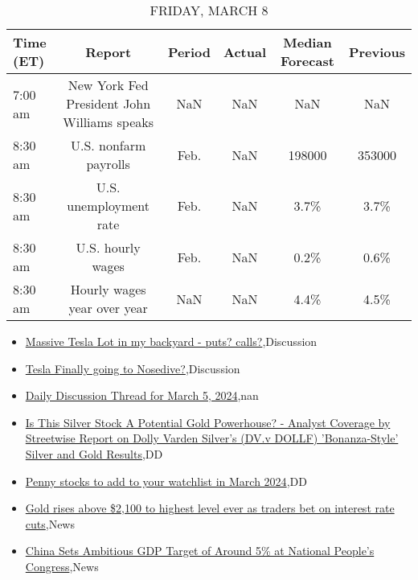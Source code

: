\documentclass{article}%
\begin{document}
%


\begin{table}[htbp]%
\caption{FRIDAY, MARCH 8}%
\centering%
\begin{adjustbox}{width=1\textwidth}%
\begin{tabular}{lccccc}
\toprule
Time (ET) &                                      Report & Period & Actual & Median Forecast & Previous \\
\midrule
  7:00 am & New York Fed President John Williams speaks &    NaN &    NaN &             NaN &      NaN \\
  8:30 am &                       U.S. nonfarm payrolls &   Feb. &    NaN &          198000 &   353000 \\
  8:30 am &                      U.S. unemployment rate &   Feb. &    NaN &            3.7\% &     3.7\% \\
  8:30 am &                           U.S. hourly wages &   Feb. &    NaN &            0.2\% &     0.6\% \\
  8:30 am &                 Hourly wages year over year &    NaN &    NaN &            4.4\% &     4.5\% \\
\bottomrule
\end{tabular}
%
\end{adjustbox}%
\end{table}

%
\begin{itemize}%
\item%
\href{https://reddit.com/r/wallstreetbets/comments/1b73k25/massive\_tesla\_lot\_in\_my\_backyard\_puts\_calls/}{Massive Tesla Lot in my backyard - puts? calls?},Discussion%
\item%
\href{https://reddit.com/r/wallstreetbets/comments/1b73cor/tesla\_finally\_going\_to\_nosedive/}{Tesla Finally going to Nosedive?},Discussion%
\item%
\href{https://reddit.com/r/wallstreetbets/comments/1b72tbp/daily\_discussion\_thread\_for\_march\_5\_2024/}{Daily Discussion Thread for March 5, 2024},nan%
\item%
\href{https://reddit.com/r/Baystreetbets/comments/1b6opzm/is\_this\_silver\_stock\_a\_potential\_gold\_powerhouse/}{Is This Silver Stock A Potential Gold Powerhouse? - Analyst Coverage by Streetwise Report on Dolly Varden Silver's (DV.v DOLLF) 'Bonanza-Style' Silver and Gold Results},DD%
\item%
\href{https://reddit.com/r/Baystreetbets/comments/1b6i1xe/penny\_stocks\_to\_add\_to\_your\_watchlist\_in\_march/}{Penny stocks to add to your watchlist in March 2024},DD%
\item%
\href{https://reddit.com/r/StockMarket/comments/1b6pqp2/gold\_rises\_above\_2100\_to\_highest\_level\_ever\_as/}{Gold rises above \$2,100 to highest level ever as traders bet on interest rate cuts},News%
\item%
\href{https://reddit.com/r/Economics/comments/1b6rc39/china\_sets\_ambitious\_gdp\_target\_of\_around\_5\_at/}{China Sets Ambitious GDP Target of Around 5\% at National People's Congress},News%
\end{itemize}%
\end{document}
